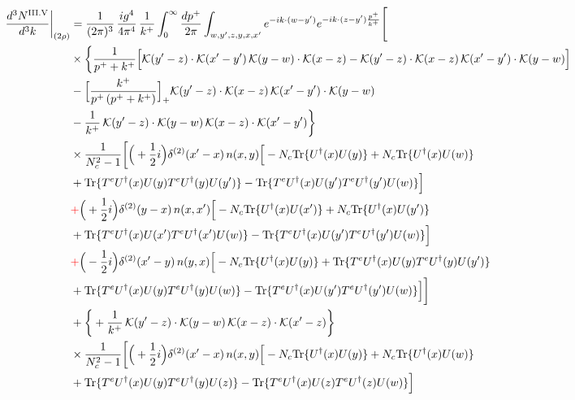 \documentclass[9pt]{article}
\numberwithin{equation}{section}
\begin{document}
\begin{align}
\frac{d^{3}N^{\rm III.V}}{d^{3}k}\bigg|_{(2\rho)}&=\frac{1}{(2\pi)^{3}}\,\frac{ig^{4}}{4\pi^{4}}\,\frac{1}{k^{+}}\int_{0}^{\infty}\frac{dp^{+}}{2\pi}\int_{w,y',z,y,x,x'}e^{-ik\cdot(w-y')}e^{-ik\cdot(z-y')\frac{p^{+}}{k^{+}}}\Bigg[\notag\\
&\times\bigg\{\frac{1}{p^{+}+k^{+}}\Big[\mathcal{K}(y'-z)\cdot\mathcal{K}(x'-y')\,\mathcal{K}(y-w)\cdot\mathcal{K}(x-z)-\mathcal{K}(y'-z)\cdot\mathcal{K}(x-z)\,\mathcal{K}(x'-y')\cdot\mathcal{K}(y-w)\Big]\notag\\
&-\Big[\frac{k^{+}}{p^{+}\,(p^{+}+k^{+})}\Big]_{+}\mathcal{K}(y'-z)\cdot\mathcal{K}(x-z)\,\mathcal{K}(x'-y')\cdot\mathcal{K}(y-w)\notag\\
&-\frac{1}{k^{+}}\,\mathcal{K}(y'-z)\cdot\mathcal{K}(y-w)\,\mathcal{K}(x-z)\cdot\mathcal{K}(x'-y')\bigg\}\notag\\
&\times \frac{1}{N_{c}^{2}-1}\bigg[\Big(+\frac{1}{2}i\Big)\delta^{(2)}(x'-x)\,n(x,y)\Big[-N_{c}{\rm Tr}\{U^{\dagger}(x)U(y)\}+N_{c}{\rm Tr}\{U^{\dagger}(x)U(w)\}\notag\\
& +{\rm Tr}\{T^{e}U^{\dagger}(x)U(y)T^{e}U^{\dagger}(y)U(y')\}-{\rm Tr}\{T^{e}U^{\dagger}(x)U(y')T^{e}U^{\dagger}(y')U(w)\}\Big]\notag\\
& {\color{red}+}\Big(+\frac{1}{2}i\Big)\delta^{(2)}(y-x)\,n(x,x')\Big[-N_{c}{\rm Tr}\{U^{\dagger}(x)U(x')\}+N_{c}{\rm Tr}\{U^{\dagger}(x)U(y')\}\notag\\
& +{\rm Tr}\{T^{e}U^{\dagger}(x)U(x')T^{e}U^{\dagger}(x')U(w)\}-{\rm Tr}\{T^{e}U^{\dagger}(x)U(y')T^{e}U^{\dagger}(y')U(w)\}\Big]\notag\\
& {\color{red}+}\Big(-\frac{1}{2}i\Big)\delta^{(2)}(x'-y)\,n(y,x)\Big[-N_{c}{\rm Tr}\{U^{\dagger}(x)U(y)\}+{\rm Tr}\{T^{e}U^{\dagger}(x)U(y)T^{e}U^{\dagger}(y)U(y')\}\notag\\
& +{\rm Tr}\{T^{e}U^{\dagger}(x)U(y)T^{e}U^{\dagger}(y)U(w)\}-{\rm Tr}\{T^{e}U^{\dagger}(x)U(y')T^{e}U^{\dagger}(y')U(w)\}\Big]\bigg]\notag\\
&+\bigg\{+\frac{1}{k^{+}}\,\mathcal{K}(y'-z)\cdot\mathcal{K}(y-w)\,\mathcal{K}(x-z)\cdot\mathcal{K}(x'-z)\bigg\}\notag\\
&\times \frac{1}{N_{c}^{2}-1}\bigg[\Big(+\frac{1}{2}i\Big)\delta^{(2)}(x'-x)\,n(x,y)\Big[-N_{c}{\rm Tr}\{U^{\dagger}(x)U(y)\}+N_{c}{\rm Tr}\{U^{\dagger}(x)U(w)\}\notag\\
& +{\rm Tr}\{T^{e}U^{\dagger}(x)U(y)T^{e}U^{\dagger}(y)U(z)\}-{\rm Tr}\{T^{e}U^{\dagger}(x)U(z)T^{e}U^{\dagger}(z)U(w)\}\Big]\notag\\

\end{align}
\end{document}
